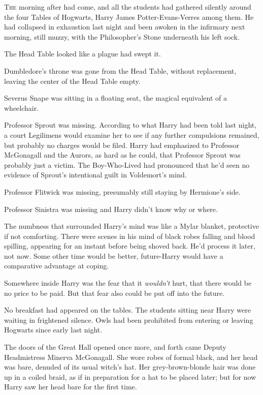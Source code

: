 
\lettrine{T}{he} morning after
had come, and all the students had gathered silently around the four Tables of
Hogwarts, Harry James Potter-Evans-Verres among them. He had collapsed in
exhaustion last night and been awoken in the infirmary next morning, still
muzzy, with the Philosopher's Stone underneath his left sock.

The Head Table looked like a plague had swept it.

Dumbledore's throne was gone from the Head Table, without replacement, leaving
the center of the Head Table empty.

Severus Snape was sitting in a floating seat, the magical equivalent of a
wheelchair.

Professor Sprout was missing. According to what Harry had been told last night,
a court Legilimens would examine her to see if any further compulsions
remained, but probably no charges would be filed. Harry had emphasized to
Professor McGonagall and the Aurors, as hard as he could, that Professor Sprout
was probably just a victim. The Boy-Who-Lived had pronounced that he'd seen no
evidence of Sprout's intentional guilt in Voldemort's mind.

Professor Flitwick was missing, presumably still staying by Hermione's side.

Professor Sinistra was missing and Harry didn't know why or where.

The numbness that surrounded Harry's mind was like a Mylar blanket, protective
if not comforting. There were scenes in his mind of black robes falling and
blood spilling, appearing for an instant before being shoved back. He'd process
it later, not now. Some other time would be better, future-Harry would have a
comparative advantage at coping.

Somewhere inside Harry was the fear that it \emph{wouldn't} hurt, that there
would be no price to be paid. But that fear also could be put off into the
future.

No breakfast had appeared on the tables. The students sitting near Harry were
waiting in frightened silence. Owls had been prohibited from entering or
leaving Hogwarts since early last night.

The doors of the Great Hall opened once more, and forth came Deputy
Headmistress Minerva McGonagall. She wore robes of formal black, and her head
was bare, denuded of its usual witch's hat. Her grey-brown-blonde hair was done
up in a coiled braid, as if in preparation for a hat to be placed later; but
for now Harry saw her head bare for the first time.

